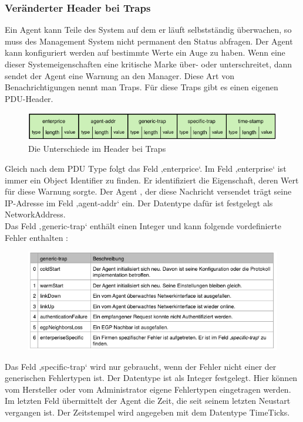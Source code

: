 \documentclass[11pt,a4paper]{article}
\begin{document}
\subsubsection{Veränderter Header bei Traps}
Ein Agent kann Teile des System auf dem er läuft selbstständig überwachen, so muss des Management System nicht permanent den Status abfragen. Der Agent kann konfiguriert werden auf bestimmte Werte ein Auge zu haben. Wenn eine dieser Systemeigenschaften eine kritische Marke über- oder unterschreitet, dann sendet der Agent eine Warnung an den Manager. Diese Art von Benachrichtigungen nennt man Traps. Für diese Traps gibt es einen eigenen PDU-Header.\\
\begin{figure}[h]
	\centering
	\includegraphics[scale=.8]{Bilder/SNMPv1-Header-Traps.png}
	\caption{Die Unterschiede im Header bei Traps}
\end{figure}
Gleich nach dem PDU Type folgt das Feld ‚enterprice‘. Im Feld ‚enterprise‘ ist immer ein Object Identifier zu finden. Er identifiziert die Eigenschaft, deren Wert für diese Warnung sorgte. Der Agent , der diese Nachricht versendet trägt seine IP-Adresse im Feld ‚agent-addr‘ ein. Der Datentype dafür ist festgelegt als NetworkAddress.\\
Das Feld ‚generic-trap‘ enthält einen Integer und kann folgende vordefinierte Fehler enthalten :\\
\begin{figure}[h]
	\centering
	\includegraphics[scale=.8]{Bilder/SNMPv1-Traps-Fehler.png}
\end{figure}
Das Feld ‚specific-trap‘ wird nur gebraucht, wenn der Fehler nicht einer der generischen Fehlertypen ist. Der Datentype ist als Integer festgelegt. Hier können vom Hersteller oder vom Administrator eigene Fehlertypen eingetragen werden.\\
Im letzten Feld übermittelt der Agent die Zeit, die seit seinem letzten Neustart vergangen ist. Der Zeitstempel wird angegeben mit dem Datentype TimeTicks.\\
\end{document}
